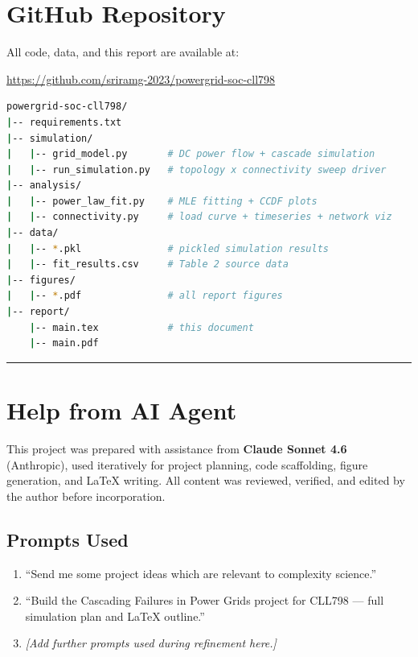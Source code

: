 \documentclass[12pt,a4paper]{article}
\begin{document}
\section*{GitHub Repository}

\noindent
All code, data, and this report are available at:
\begin{center}
\url{https://github.com/sriramg-2023/powergrid-soc-cll798}
\end{center}

\begin{lstlisting}[language=bash, numbers=none]
powergrid-soc-cll798/
|-- requirements.txt
|-- simulation/
|   |-- grid_model.py       # DC power flow + cascade simulation
|   |-- run_simulation.py   # topology x connectivity sweep driver
|-- analysis/
|   |-- power_law_fit.py    # MLE fitting + CCDF plots
|   |-- connectivity.py     # load curve + timeseries + network viz
|-- data/
|   |-- *.pkl               # pickled simulation results
|   |-- fit_results.csv     # Table 2 source data
|-- figures/
|   |-- *.pdf               # all report figures
|-- report/
    |-- main.tex            # this document
    |-- main.pdf
\end{lstlisting}

\vspace{1em}
\hrule

\section*{Help from AI Agent}

\noindent
This project was prepared with assistance from \textbf{Claude Sonnet 4.6}
(Anthropic), used iteratively for project planning, code scaffolding,
figure generation, and \LaTeX{} writing. All content was reviewed,
verified, and edited by the author before incorporation.

\subsection*{Prompts Used}

\begin{enumerate}\setlength\itemsep{2pt}

    \item ``Send me some project ideas which are relevant to
    complexity science.''

    \item ``Build the Cascading Failures in Power Grids project for
    CLL798 --- full simulation plan and LaTeX outline.''

    \item \textit{[Add further prompts used during refinement here.]}

\end{enumerate}
\end{document}
